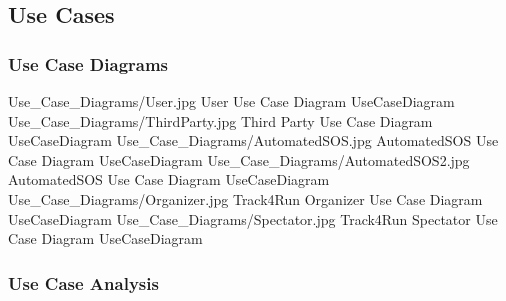 \documentclass[../../rasd.tex]{subfiles}
\begin{document}
                \subsection{Use Cases}

                    \subsubsection{Use Case Diagrams}
                        \image {13cm} {Use_Case_Diagrams/User.jpg} {User Use Case Diagram} {UseCaseDiagram}
                        \image {13cm} {Use_Case_Diagrams/ThirdParty.jpg} {Third Party Use Case Diagram} {UseCaseDiagram}
                        \image {13cm} {Use_Case_Diagrams/AutomatedSOS.jpg} {AutomatedSOS Use Case Diagram} {UseCaseDiagram}
                        \image {13cm} {Use_Case_Diagrams/AutomatedSOS2.jpg} {AutomatedSOS Use Case Diagram} {UseCaseDiagram}
                        \image {13cm} {Use_Case_Diagrams/Organizer.jpg} {Track4Run Organizer Use Case Diagram} {UseCaseDiagram}
                        \image {13cm} {Use_Case_Diagrams/Spectator.jpg} {Track4Run Spectator Use Case Diagram} {UseCaseDiagram}

                \subsubsection{Use Case Analysis}
\end{document}
